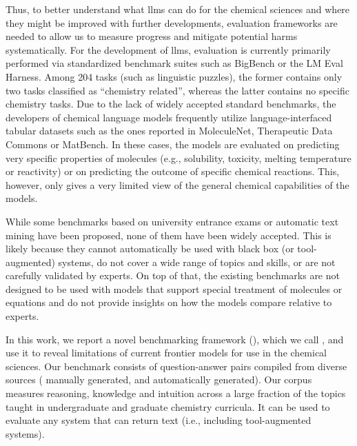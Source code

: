 \documentclass[11pt, oneside]{article}
\begin{document}
\begin{refsection}
Thus, to better understand what \glspl{llm} can do for the chemical sciences and where they might be improved with further developments, evaluation frameworks are needed to allow us to measure progress and mitigate potential harms systematically.
For the development of \glspl{llm}, evaluation is currently primarily performed via standardized benchmark suites such as BigBench\autocite{srivastava2022beyond} or the LM Eval Harness.\autocite{eval-harness}
Among 204 tasks (such as linguistic puzzles), the former contains only two tasks classified as \enquote{chemistry related}, whereas the latter contains no specific chemistry tasks.
Due to the lack of widely accepted standard benchmarks, the developers of chemical language models\autocite{jablonka2024leveraging, guo2023large, ahmad2022chemberta2, Cai_2024, frey2023neural} frequently utilize language-interfaced\autocite{dinh2022lift} tabular datasets such as the ones reported in MoleculeNet,\autocite{wu2018moleculenet} Therapeutic Data Commons\autocite{huang2021therapeutics} or MatBench.\autocite{Dunn_2020}
In these cases, the models are evaluated on predicting very specific properties of molecules (e.g., solubility, toxicity, melting temperature or reactivity) or on predicting the outcome of specific chemical reactions.
This, however, only gives a very limited view of the general chemical capabilities of the models.

While some benchmarks based on university entrance exams\autocite{Zaki_2024, arora2023llms} or automatic text mining\autocite{song2023honeybee, wei2021chemistryqa, song-etal-2023-matsci} have been proposed, none of them have been widely accepted.
This is likely because they cannot automatically be used with black box (or tool-augmented) systems, do not cover a wide range of topics and skills, or are not carefully validated by experts.
On top of that, the existing benchmarks are not designed to be used with models that support special treatment of molecules or equations and do not provide insights on how the models compare relative to experts.

In this work, we report a novel benchmarking framework  (), which we call \chembench, and use it to reveal limitations of current frontier models for use in the chemical sciences.
Our benchmark consists of \xspace question-answer pairs compiled from diverse sources (\xspace manually generated, and \xspace automatically generated).
Our corpus measures reasoning, knowledge and intuition across a large fraction of the topics taught in undergraduate and graduate chemistry curricula. It can be used to evaluate any system that can return text (i.e., including tool-augmented systems).


\end{refsection}
\end{document}
